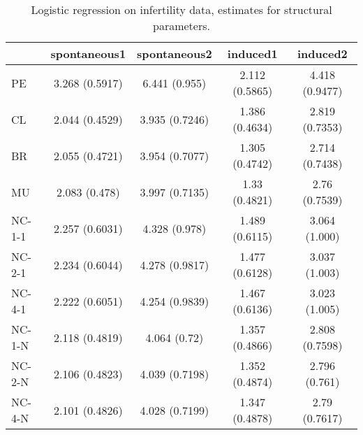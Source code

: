 \begin{table}

\caption{\label{tab:infertdata}Logistic regression on infertility data, estimates for structural parameters.}
\centering
\begin{tabular}[t]{l|cccc}

  & spontaneous1 & spontaneous2 & induced1 & induced2\\
\hline
PE & 3.268 (0.5917) & 6.441 (0.955) & 2.112 (0.5865) & 4.418 (0.9477)\\

CL & 2.044 (0.4529) & 3.935 (0.7246) & 1.386 (0.4634) & 2.819 (0.7353)\\

BR & 2.055 (0.4721) & 3.954 (0.7077) & 1.305 (0.4742) & 2.714 (0.7438)\\

MU & 2.083 (0.478) & 3.997 (0.7135) & 1.33 (0.4821) & 2.76 (0.7539)\\

NC-1-1 & 2.257 (0.6031) & 4.328 (0.978) & 1.489 (0.6115) & 3.064 (1.000)\\

NC-2-1 & 2.234 (0.6044) & 4.278 (0.9817) & 1.477 (0.6128) & 3.037 (1.003)\\

NC-4-1 & 2.222 (0.6051) & 4.254 (0.9839) & 1.467 (0.6136) & 3.023 (1.005)\\

NC-1-N & 2.118 (0.4819) & 4.064 (0.72) & 1.357 (0.4866) & 2.808 (0.7598)\\

NC-2-N & 2.106 (0.4823) & 4.039 (0.7198) & 1.352 (0.4874) & 2.796 (0.761)\\

NC-4-N & 2.101 (0.4826) & 4.028 (0.7199) & 1.347 (0.4878) & 2.79 (0.7617)\\

\end{tabular}
\end{table}
